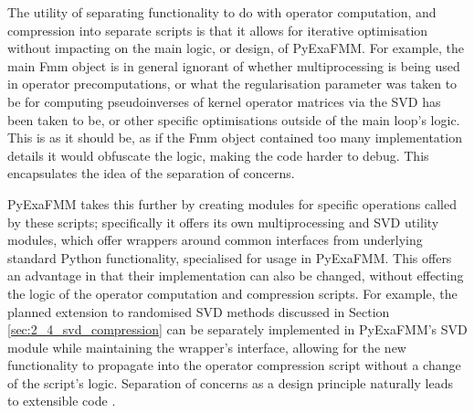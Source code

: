 The utility of separating functionality to do with operator computation, and
compression into separate scripts is that it allows for iterative optimisation
without impacting on the main logic, or design, of \gls{PyExaFMM}. For example,
the main Fmm object is in general ignorant of whether multiprocessing
is being used in operator precomputations, or what the regularisation parameter
was taken to be for computing pseudoinverses of kernel operator matrices
via the SVD has been taken to be, or other specific optimisations outside of the
main loop's logic. This is as it should be, as if the Fmm
object contained too many implementation details it would obfuscate the logic,
making the code harder to debug. This encapsulates the idea of the separation of
concerns.

\gls{PyExaFMM} takes this further by creating modules for specific
operations called by these scripts; specifically it offers its own multiprocessing
and SVD utility modules, which offer wrappers around common interfaces from
underlying standard Python functionality, specialised for usage in \gls{PyExaFMM}.
This offers an advantage in that their implementation can also be changed,
without effecting the logic of the operator computation and compression scripts.
For example, the planned extension to randomised SVD methods discussed in
Section \ref{sec:2_4_svd_compression} can be separately implemented in \gls{PyExaFMM}'s
SVD module while maintaining the wrapper's interface, allowing for the new
functionality to propagate into the operator compression script without
a change of the script's logic. Separation of concerns as a design
principle naturally leads to extensible code \cite{Gamma:1994:Addison}.
